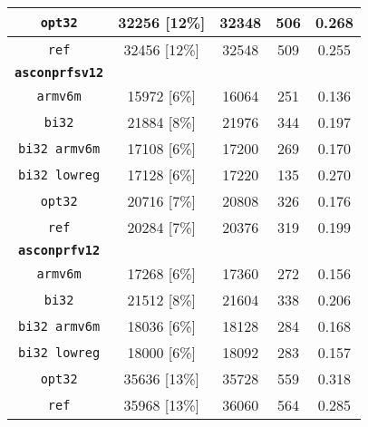 \begin{table}[h]
\begin{adjustbox}{width=304pt}
\begin{tabular}{|c|c|c|c|c|}
        \hline
        \texttt{opt32} & 32256 [12\%] & 32348 & 506 & 0.268 \\
        \hline
        \texttt{ref} & 32456 [12\%] & 32548 & 509 & 0.255 \\
        \hline
        \texttt{\textbf{asconprfsv12}} & & & & \\
        \hline
        \texttt{armv6m} & 15972 [6\%] & 16064 & 251 & 0.136 \\
        \hline
        \texttt{bi32} & 21884 [8\%] & 21976 & 344 & 0.197 \\
        \hline
        \texttt{bi32 armv6m} & 17108 [6\%] & 17200 & 269 & 0.170 \\
        \hline
        \texttt{bi32 lowreg} & 17128 [6\%] & 17220 & 135 & 0.270 \\
        \hline
        \texttt{opt32} & 20716 [7\%] & 20808 & 326 & 0.176 \\
        \hline
        \texttt{ref} & 20284 [7\%] & 20376 & 319 & 0.199 \\
        \hline
        \texttt{\textbf{asconprfv12}} & & & & \\
        \hline
        \texttt{armv6m} & 17268 [6\%] & 17360 & 272 & 0.156 \\
        \hline
        \texttt{bi32} & 21512 [8\%] & 21604 & 338 & 0.206 \\
        \hline
        \texttt{bi32 armv6m} & 18036 [6\%] & 18128 & 284 & 0.168 \\
        \hline
        \texttt{bi32 lowreg} & 18000 [6\%] & 18092 & 283 & 0.157 \\
        \hline
        \texttt{opt32} & 35636 [13\%] & 35728 & 559 & 0.318 \\
        \hline
        \texttt{ref} & 35968 [13\%] & 36060 & 564 & 0.285 \\
        \hline
    \end{tabular}
    \end{adjustbox}
\end{table}

